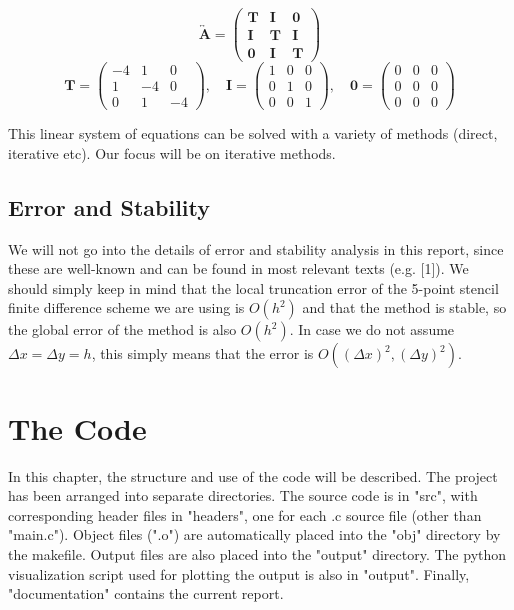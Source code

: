 \documentclass[11pt]{report}
\begin{document}
\begin{equation}
\overleftrightarrow{\textbf{A}} = 
\begin{pmatrix}
\bm{T} & \bm{I} & \bm{0} \\
\bm{I} & \bm{T} & \bm{I} \\
\bm{0} & \bm{I} & \bm{T}
\end{pmatrix}
\end{equation}
\vspace{0.5cm}
\begin{equation}
\bm{T} =
\begin{pmatrix}
-4 & 1 & 0 \\
1 & -4 & 0 \\
0 & 1 & -4
\end{pmatrix}
, \quad
\bm{I} =
\begin{pmatrix}
1 & 0 & 0 \\
0 & 1 & 0 \\
0 & 0 & 1
\end{pmatrix}
, \quad
\bm{0} =
\begin{pmatrix}
0 & 0 & 0 \\
0 & 0 & 0 \\
0 & 0 & 0
\end{pmatrix}
\end{equation}

\vspace{0.5cm}

This linear system of equations can be solved with a variety of methods (direct, iterative etc). Our focus will be on iterative methods.

\section{Error and Stability}
We will not go into the details of error and stability analysis in this report, since these are well-known 
and can be found in most relevant texts (e.g. [1]). We should simply keep in mind that the local truncation error of the 5-point stencil finite difference scheme we are using is $O(h^2)$ and that the method is stable, so the global error of the method is also $O(h^2)$. In case we do not assume $\Delta x = \Delta y = h$, this 
simply means that the error is $O\left( (\Delta x)^2, (\Delta y)^2 \right)$.

\chapter{The Code}
In this chapter, the structure and use of the code will be described. The project has been arranged into 
separate directories. The source code is in "src", with corresponding header files in "headers", one for each 
.c source file (other than "main.c"). Object files (".o") are automatically placed into the "obj" directory by the makefile. Output files are also placed into the "output" directory. The python visualization script used 
for plotting the output is also in "output". Finally, "documentation" contains the current report.
\end{document}
